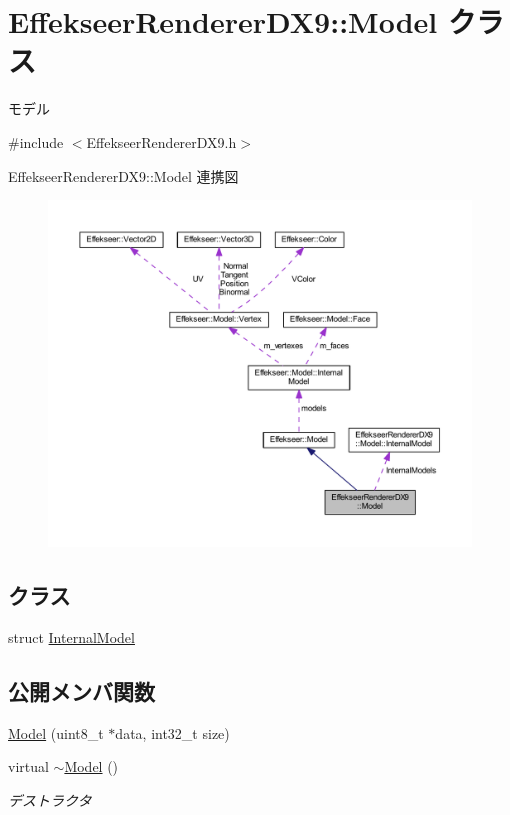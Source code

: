 \hypertarget{class_effekseer_renderer_d_x9_1_1_model}{}\section{Effekseer\+Renderer\+D\+X9\+:\+:Model クラス}
\label{class_effekseer_renderer_d_x9_1_1_model}


モデル  




{\ttfamily \#include $<$Effekseer\+Renderer\+D\+X9.\+h$>$}



Effekseer\+Renderer\+D\+X9\+:\+:Model 連携図\nopagebreak
\begin{figure}[H]
\begin{center}
\leavevmode
\includegraphics[width=350pt]{class_effekseer_renderer_d_x9_1_1_model__coll__graph}
\end{center}
\end{figure}
\subsection*{クラス}
\begin{DoxyCompactItemize}
\item 
struct \mbox{\hyperlink{struct_effekseer_renderer_d_x9_1_1_model_1_1_internal_model}{Internal\+Model}}
\end{DoxyCompactItemize}
\subsection*{公開メンバ関数}
\begin{DoxyCompactItemize}
\item 
\mbox{\hyperlink{class_effekseer_renderer_d_x9_1_1_model_a2cc666c9789232bbe6bb09e5cf3fad6a}{Model}} (uint8\+\_\+t $\ast$data, int32\+\_\+t size)
\item 
virtual \mbox{\hyperlink{class_effekseer_renderer_d_x9_1_1_model_a5878dbe0a5971ffb28d6c1af347c6e87}{$\sim$\+Model}} ()
\begin{DoxyCompactList}\small\item\em デストラクタ \end{DoxyCompactList}\end{DoxyCompactItemize}
